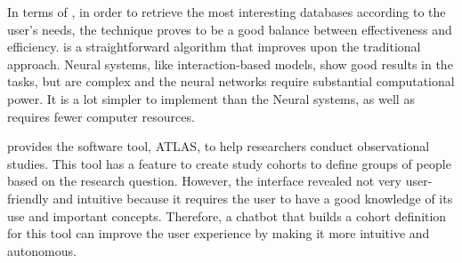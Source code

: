 In terms of {\ir}, in order to retrieve the most interesting databases according to the user's needs, the {\bm} technique proves to be a good balance between effectiveness and efficiency. {\bm} is a straightforward algorithm that improves upon the traditional {\tfidf} approach. Neural {\ir} systems, like interaction-based models, show good results in the {\ir} tasks, but are complex and the neural networks require substantial computational power. It is a lot simpler to implement than the Neural {\ir} systems, as well as requires fewer computer resources. 


{\ohdsi} provides the software tool, ATLAS, to help researchers conduct observational studies. This tool has a feature to create study cohorts to define groups of people based on the research question. However, the interface revealed not very user-friendly and intuitive because it requires the user to have a good knowledge of its use and important concepts. Therefore, a chatbot that builds a cohort definition for this tool can improve the user experience by making it more intuitive and autonomous.


